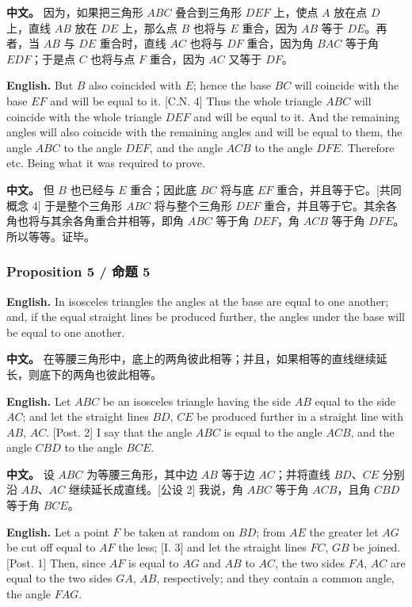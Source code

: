 \noindent\textbf{中文。} 因为，如果把三角形 $ABC$ 叠合到三角形 $DEF$ 上，使点 $A$ 放在点 $D$ 上，直线 $AB$ 放在 $DE$ 上，那么点 $B$ 也将与 $E$ 重合，因为 $AB$ 等于 $DE$。再者，当 $AB$ 与 $DE$ 重合时，直线 $AC$ 也将与 $DF$ 重合，因为角 $BAC$ 等于角 $EDF$；于是点 $C$ 也将与点 $F$ 重合，因为 $AC$ 又等于 $DF$。

\noindent\textbf{English.} But $B$ also coincided with $E$; hence the base $BC$ will coincide with the base $EF$ and will be equal to it. [C.N. 4] Thus the whole triangle $ABC$ will coincide with the whole triangle $DEF$ and will be equal to it. And the remaining angles will also coincide with the remaining angles and will be equal to them, the angle $ABC$ to the angle $DEF$, and the angle $ACB$ to the angle $DFE$. Therefore etc. Being what it was required to prove.

\noindent\textbf{中文。} 但 $B$ 也已经与 $E$ 重合；因此底 $BC$ 将与底 $EF$ 重合，并且等于它。[共同概念 4] 于是整个三角形 $ABC$ 将与整个三角形 $DEF$ 重合，并且等于它。其余各角也将与其余各角重合并相等，即角 $ABC$ 等于角 $DEF$，角 $ACB$ 等于角 $DFE$。所以等等。证毕。

\subsubsection*{Proposition 5 / 命题 5}

\noindent\textbf{English.} In isosceles triangles the angles at the base are equal to one another; and, if the equal straight lines be produced further, the angles under the base will be equal to one another.

\noindent\textbf{中文。} 在等腰三角形中，底上的两角彼此相等；并且，如果相等的直线继续延长，则底下的两角也彼此相等。

\noindent\textbf{English.} Let $ABC$ be an isosceles triangle having the side $AB$ equal to the side $AC$; and let the straight lines $BD$, $CE$ be produced further in a straight line with $AB$, $AC$. [Post. 2] I say that the angle $ABC$ is equal to the angle $ACB$, and the angle $CBD$ to the angle $BCE$.

\noindent\textbf{中文。} 设 $ABC$ 为等腰三角形，其中边 $AB$ 等于边 $AC$；并将直线 $BD$、$CE$ 分别沿 $AB$、$AC$ 继续延长成直线。[公设 2] 我说，角 $ABC$ 等于角 $ACB$，且角 $CBD$ 等于角 $BCE$。

\noindent\textbf{English.} Let a point $F$ be taken at random on $BD$; from $AE$ the greater let $AG$ be cut off equal to $AF$ the less; [I. 3] and let the straight lines $FC$, $GB$ be joined. [Post. 1] Then, since $AF$ is equal to $AG$ and $AB$ to $AC$, the two sides $FA$, $AC$ are equal to the two sides $GA$, $AB$, respectively; and they contain a common angle, the angle $FAG$.

